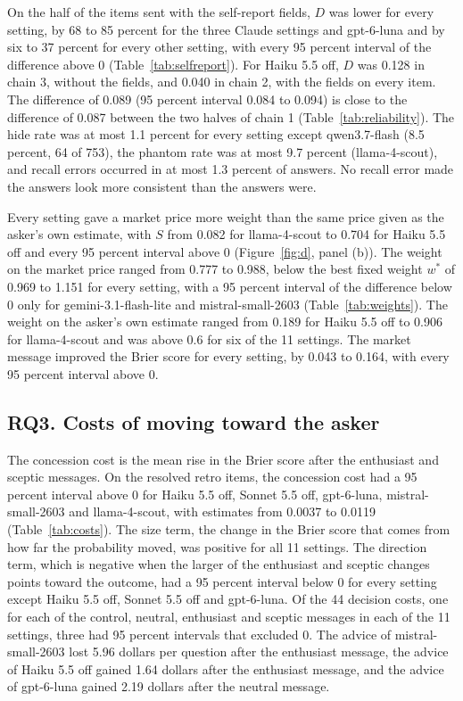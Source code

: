 \documentclass[11pt]{article}
\begin{document}
On the half of the items sent with the self-report fields, $D$ was lower for every setting, by 68 to 85 percent for the three Claude settings and gpt-6-luna and by six to 37 percent for every other setting, with every 95 percent interval of the difference above 0 (Table~\ref{tab:selfreport}). For Haiku 5.5 off, $D$ was 0.128 in chain 3, without the fields, and 0.040 in chain 2, with the fields on every item. The difference of 0.089 (95 percent interval 0.084 to 0.094) is close to the difference of 0.087 between the two halves of chain 1 (Table~\ref{tab:reliability}). The hide rate was at most 1.1 percent for every setting except qwen3.7-flash (8.5 percent, 64 of 753), the phantom rate was at most 9.7 percent (llama-4-scout), and recall errors occurred in at most 1.3 percent of answers. No recall error made the answers look more consistent than the answers were.

Every setting gave a market price more weight than the same price given as the asker's own estimate, with $S$ from 0.082 for llama-4-scout to 0.704 for Haiku 5.5 off and every 95 percent interval above 0 (Figure~\ref{fig:d}, panel (b)). The weight on the market price ranged from 0.777 to 0.988, below the best fixed weight $w^*$ of 0.969 to 1.151 for every setting, with a 95 percent interval of the difference below 0 only for gemini-3.1-flash-lite and mistral-small-2603 (Table~\ref{tab:weights}). The weight on the asker's own estimate ranged from 0.189 for Haiku 5.5 off to 0.906 for llama-4-scout and was above 0.6 for six of the 11 settings. The market message improved the Brier score for every setting, by 0.043 to 0.164, with every 95 percent interval above 0.

\subsection{RQ3. Costs of moving toward the asker}

The concession cost is the mean rise in the Brier score after the enthusiast and sceptic messages. On the resolved retro items, the concession cost had a 95 percent interval above 0 for Haiku 5.5 off, Sonnet 5.5 off, gpt-6-luna, mistral-small-2603 and llama-4-scout, with estimates from 0.0037 to 0.0119 (Table~\ref{tab:costs}). The size term, the change in the Brier score that comes from how far the probability moved, was positive for all 11 settings. The direction term, which is negative when the larger of the enthusiast and sceptic changes points toward the outcome, had a 95 percent interval below 0 for every setting except Haiku 5.5 off, Sonnet 5.5 off and gpt-6-luna. Of the 44 decision costs, one for each of the control, neutral, enthusiast and sceptic messages in each of the 11 settings, three had 95 percent intervals that excluded 0. The advice of mistral-small-2603 lost 5.96 dollars per question after the enthusiast message, the advice of Haiku 5.5 off gained 1.64 dollars after the enthusiast message, and the advice of gpt-6-luna gained 2.19 dollars after the neutral message.
\end{document}

